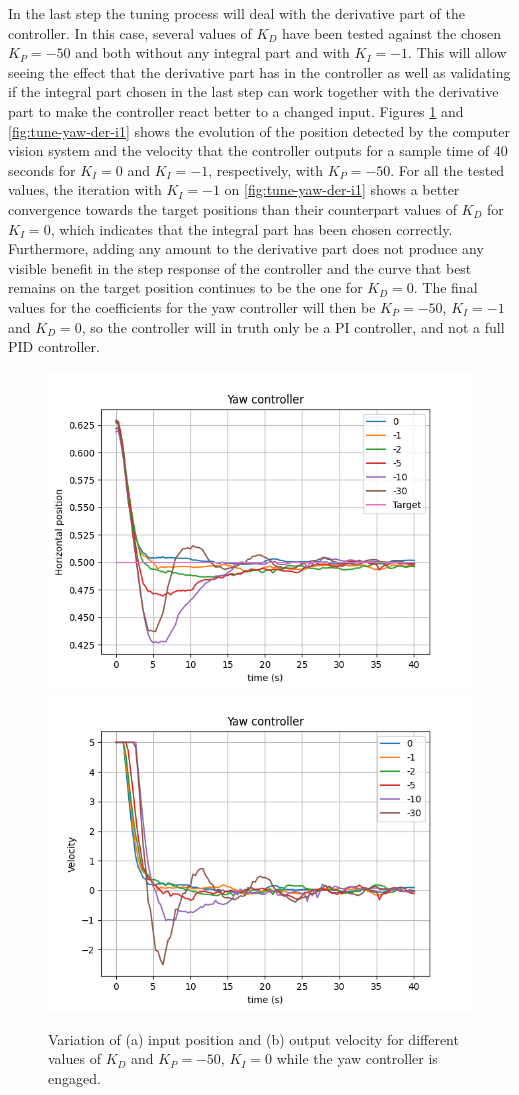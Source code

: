 In the last step the tuning process will deal with the derivative part of the controller.
In this case, several values of $K_D$ have been tested against the chosen $K_P=-50$ and both without any integral part and with $K_I=-1$.
This will allow seeing the effect that the derivative part has in the controller as well as validating if the integral part chosen in the last step can work together with the derivative part to make the controller react better to a changed input.
Figures \ref{fig:tune-yaw-der-i0} and \ref{fig:tune-yaw-der-i1} shows the evolution of the position detected by the computer vision system and the velocity that the controller outputs for a sample time of 40 seconds for $K_I=0$ and $K_I=-1$, respectively, with $K_P=-50$.
For all the tested values, the iteration with $K_I=-1$ on \ref{fig:tune-yaw-der-i1} shows a better convergence towards the target positions than their counterpart values of $K_D$ for $K_I=0$, which indicates that the integral part has been chosen correctly.
Furthermore, adding any amount to the derivative part does not produce any visible benefit in the step response of the controller and the curve that best remains on the target position continues to be the one for $K_D=0$.
The final values for the coefficients for the yaw controller will then be $K_P=-50$, $K_I=-1$ and $K_D=0$, so the controller will in truth only be a PI controller, and not a full PID controller.


\begin{figure}
  \centering
  \includegraphics[width=.45\linewidth]{img/pid/yaw/yaw_pos_p50_i0_der.png}
  \includegraphics[width=.45\linewidth]{img/pid/yaw/yaw_vel_p50_i0_der.png}
  \caption{Variation of (a) input position and (b) output velocity for different values of $K_{D}$ and $K_P=-50$, $K_I=0$ while the yaw controller is engaged.}\label{fig:tune-yaw-der-i0}
\end{figure}

